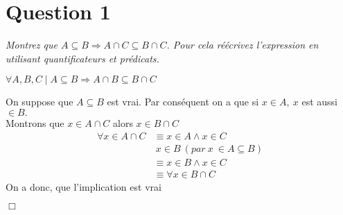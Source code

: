\section*{Question 1}
\emph{Montrez que \( A \subseteq B \Rightarrow A \cap C \subseteq B \cap C\). Pour cela réécrivez l’expression en utilisant quantificateurs et prédicats.}
\bigskip
\centerline{$\forall A,B,C \mid A \subseteq B \Rightarrow A \cap B \subseteq B \cap C$}
\bigskip
{On suppose que $A \subseteq B$ est vrai. Par conséquent on a que si $x \in A,\ x$ est aussi $\in B.$\\
	Montrons que $x \in A \cap C$ alors $x \in B \cap C$}
\begin{align*}
	\forall x \in A \cap C &\equiv x \in A \wedge x \in C\\
	&\ x \in B\ (par\ x\ \in A \subseteq B)\\
	&\equiv x \in B \wedge x \in C\\
	&\equiv \forall x \in B \cap C
\end{align*}
\smallskip
{On a donc, que l'implication est vrai}
\begin{flushright}
	$\Box$
\end{flushright}